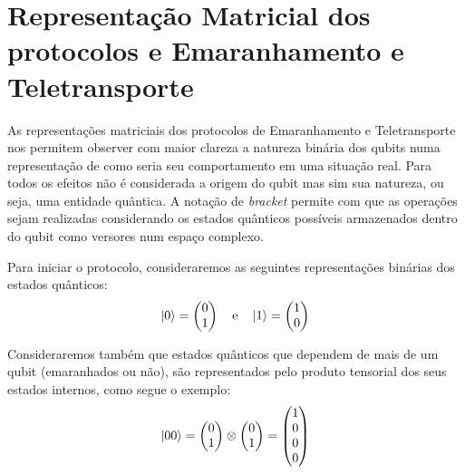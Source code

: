 
\chapter{Representação Matricial dos protocolos e Emaranhamento e Teletransporte}

As representações matriciais dos protocolos de Emaranhamento e Teletransporte nos permitem observer com maior clareza a natureza binária dos qubits numa representação de como seria seu comportamento em uma situação real. Para todos os efeitos não é considerada a origem do qubit mas sim sua natureza, ou seja, uma entidade quântica. A notação de \textit{bracket} permite com que as operações sejam realizadas considerando os estados quânticos possíveis armazenados dentro do qubit como versores num espaço complexo.

Para iniciar o protocolo, consideraremos as seguintes representações binárias dos estados quânticos:
\begin{equation} \label{01}
\ket{0} = \begin{pmatrix}
0 \\
1
\end{pmatrix} \quad \text{e} \quad
\ket{1} = \begin{pmatrix}
1 \\
0
\end{pmatrix}
\end{equation}

Consideraremos também que estados quânticos que dependem de mais de um qubit (emaranhados ou não), são representados pelo produto tensorial dos seus estados internos, como segue o exemplo:
\begin{equation}\label{00}
\ket{00} = \begin{pmatrix}
0 \\
1
\end{pmatrix} \otimes \begin{pmatrix}
0 \\
1
\end{pmatrix} = \begin{pmatrix}
1 \\
0 \\
0 \\
0
\end{pmatrix}
\end{equation}

